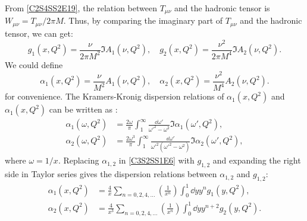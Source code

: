 From \cref{C2S4SS2E19}, the relation between $T_{\mu\nu}$ and the hadronic tensor is $W_{\mu\nu}=T_{\mu\nu}/2\pi M$. Thus, by comparing the imaginary part of $T_{\mu\nu}$ and the hadronic tensor, we can get:
\begin{equation} \label{C3S2SS1E4}
g_1(x,Q^2) = \frac{\nu}{2\pi M^2}\Im A_1(\nu,Q^2), \quad g_2(x,Q^2) = \frac{\nu^2}{2\pi M^4}\Im A_2(\nu,Q^2).
\end{equation}
We could define
\begin{equation} \label{C3S2SS1E5}
\alpha_1(x,Q^2) = \frac{\nu}{M^2}A_1(\nu,Q^2), \quad \alpha_2(x,Q^2) = \frac{\nu^2}{M^4}A_2(\nu,Q^2).
\end{equation}
for convenience.
The Kramers-Kronig dispersion relations of $\alpha_1(x,Q^2)$ and $\alpha_1(x,Q^2)$ can be written as \cite{Jaffe1990}:
\begin{equation} \label{C3S2SS1E6}
\begin{split}
\alpha_1(\omega,Q^2) & = \frac{2\omega}{\pi}\int_1^\infty\frac{\dd{\omega'}}{\omega'^2-\omega^2}\Im\alpha_1(\omega',Q^2), \\
\alpha_2(\omega,Q^2) & = \frac{2\omega^3}{\pi}\int_1^\infty\frac{\dd{\omega'}}{\omega'^2(\omega'^2-\omega^2)}\Im\alpha_2(\omega',Q^2),
\end{split}
\end{equation}
where $\omega=1/x$. Replacing $\alpha_{1,2}$ in \cref{C3S2SS1E6} with $g_{1,2}$ and expanding the right side in Taylor series gives the dispersion relations between $\alpha_{1,2}$ and $g_{1,2}$:
\begin{equation} \label{C3S2SS1E7}
\begin{split}
\alpha_1(x,Q^2) & = \frac{4}{x}\sum_{n=0,2,4,\dots}\left(\frac{1}{x^{n}}\right)\int_0^1\dd{y}y^ng_1(y,Q^2), \\
\alpha_2(x,Q^2) & = \frac{4}{x^3}\sum_{n=0,2,4,\dots}\left(\frac{1}{x^{n}}\right)\int_0^1\dd{y}y^{n+2}g_2(y,Q^2).
\end{split}
\end{equation}

